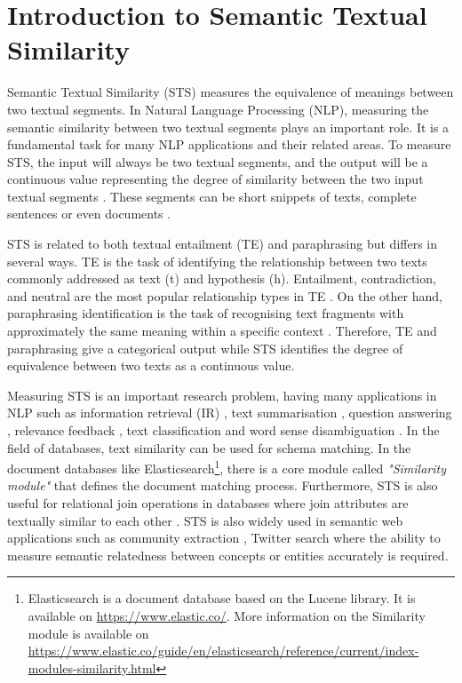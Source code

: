 \chapter{\label{cha:sts_introduction}Introduction to Semantic Textual Similarity}

Semantic Textual Similarity (STS) measures the equivalence of meanings between two textual segments. In Natural Language Processing (NLP), measuring the semantic similarity between two textual segments plays an important role. It is a fundamental task for many NLP applications and their related areas. To measure STS, the input will always be two textual segments, and the output will be a continuous value representing the degree of similarity between the two input textual segments \autocite{agirre-etal-2012-semeval}. These segments can be short snippets of texts, complete sentences or even documents \autocite{agirre-etal-2013-sem}.

STS is related to both textual entailment (TE) and paraphrasing but differs in several ways. TE is the task of identifying the relationship between two texts commonly addressed as text (t) and hypothesis (h). Entailment, contradiction, and neutral are the most popular relationship types in TE \autocite{10.1007/11736790_9,marelli-etal-2014-semeval}. On the other hand, paraphrasing identification is the task of recognising text fragments with approximately the same meaning within a specific context \autocite{info11050241}. Therefore, TE and paraphrasing give a categorical output while STS identifies the degree of equivalence between two texts as a continuous value. 

Measuring STS is an important research problem, having many applications in NLP such as information retrieval (IR) \autocite{10.1145/1097047.1097051, 5571521}, text summarisation \autocite{ALIGULIYEV20097764, SCHALLEHN2004361}, question answering \autocite{mohler-etal-2011-learning}, relevance feedback \autocite{WANG2020102342}, text classification \autocite{10.1007/978-3-642-41278-3_74, 10.1007/978-3-319-11749-2_8} and word sense disambiguation \autocite{10.1007/978-3-642-17432-2_44}. In the field of databases, text similarity can be used for schema matching. In the document databases like Elasticsearch\footnote{Elasticsearch is a document database based on the Lucene library. It is available on \url{https://www.elastic.co/}. More information on the Similarity module is available on \url{https://www.elastic.co/guide/en/elasticsearch/reference/current/index-modules-similarity.html}}, there is a core module called \textit{"Similarity module"} that defines the document matching process. Furthermore, STS is also useful for relational join operations in databases where join attributes are textually similar to each other \autocite{10.1145/352595.352598, SCHALLEHN2004361}. STS is also widely used in semantic web applications such as community extraction \autocite{10.1007/978-3-642-14589-6_33}, Twitter search \autocite{feng-etal-2013-twitter} where the ability to measure semantic relatedness between concepts or entities accurately is required.
 
